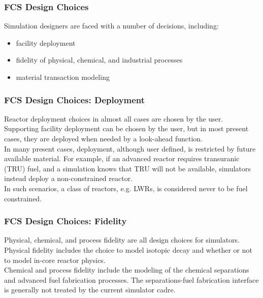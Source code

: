 \begin{frame}[ctb!]
  \frametitle{FCS Design Choices}
  Simulation designers are faced with a number of decisions, including:
  \begin{itemize}
    \item facility deployment
    \item fidelity of physical, chemical, and industrial processes
    \item material transaction modeling
  \end{itemize}
\end{frame}

\begin{frame}[ctb!]
  \frametitle{FCS Design Choices: Deployment}

  Reactor deployment choices in almost all cases are chosen by the user.\\

  Supporting facility deployment can be chosen by the user, but in most present
  cases, they are deployed when needed by a look-ahead function.\\

  In many present cases, deployment, although user defined, is restricted by
  future available material. For example, if an advanced reactor requires
  transuranic (TRU) fuel, and a simulation knows that TRU will not be available,
  simulators instead deploy a non-constrained reactor.\\

  In such scenarios, a class of reactors, e.g. LWRs, is considered never to be
  fuel constrained.
\end{frame}

\begin{frame}[ctb!]
  \frametitle{FCS Design Choices: Fidelity}

  Physical, chemical, and process fidelity are all design choices for simulators.\\

  Physical fidelity includes the choice to model isotopic decay and whether or
  not to model in-core reactor physics.\\

  Chemical and process fidelity include the modeling of the chemical separations
  and advanced fuel fabrication processes. The separations-fuel fabrication
  interface is generally not treated by the current simulator cadre.
\end{frame}

